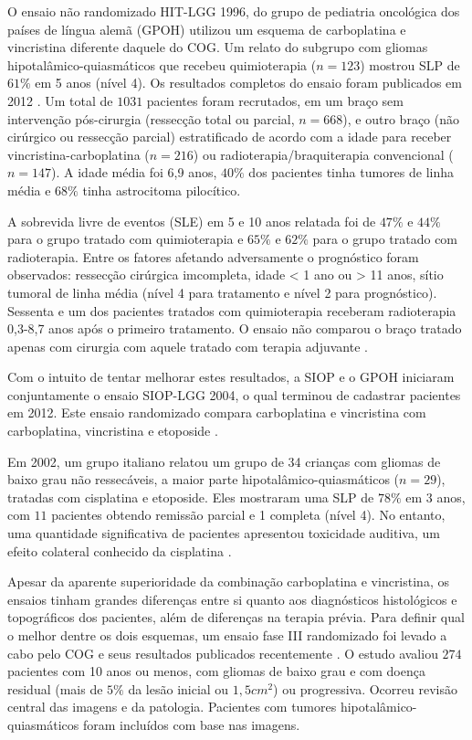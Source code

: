 \documentclass[11pt,a4paper,oldfontcommands]{memoir}
\begin{document}
O ensaio não randomizado HIT-LGG 1996, do grupo de pediatria oncológica dos países de língua alemã (GPOH) utilizou um esquema de carboplatina e vincristina diferente daquele do COG. Um relato do subgrupo com gliomas hipotalâmico-quiasmáticos que recebeu quimioterapia (\(n=123\)) mostrou SLP de \(61\%\) em 5 anos \cite{gnekow} (nível 4). Os resultados completos do ensaio foram publicados em 2012 \cite{gnekow2}. Um total de \(1031\) pacientes foram recrutados, em um braço sem intervenção pós-cirurgia (ressecção total ou parcial, \(n = 668\)), e outro braço (não cirúrgico ou ressecção parcial) estratificado de acordo com a idade para receber vincristina-carboplatina (\(n = 216\)) ou radioterapia/braquiterapia convencional (\(n = 147\)). A idade média foi 6,9 anos, \(40\%\) dos pacientes tinha tumores de linha média e \(68\%\) tinha astrocitoma pilocítico. 

A sobrevida livre de eventos (SLE) em 5 e 10 anos relatada foi de \(47\%\) e \(44\%\) para o grupo tratado com quimioterapia e \(65\%\) e \(62\%\) para o grupo tratado com radioterapia. Entre os fatores afetando adversamente o prognóstico foram observados: ressecção cirúrgica imcompleta, idade < 1 ano ou > 11 anos, sítio tumoral de linha média (nível 4 para tratamento e nível 2 para prognóstico). Sessenta e um dos pacientes tratados com quimioterapia receberam radioterapia 0,3-8,7 anos após o primeiro tratamento. O ensaio não comparou o braço tratado apenas com cirurgia com aquele tratado com terapia adjuvante \cite{gnekow2}. 

Com o intuito de tentar melhorar estes resultados, a SIOP e o GPOH iniciaram conjuntamente o ensaio SIOP-LGG 2004, o qual terminou de cadastrar pacientes em 2012. Este ensaio randomizado compara carboplatina e vincristina com carboplatina, vincristina e etoposide \cite{gnekow3}. 

Em 2002, um grupo italiano relatou um grupo de 34 crianças com gliomas de baixo grau não ressecáveis, a maior parte hipotalâmico-quiasmáticos (\(n=29\)), tratadas com cisplatina e etoposide. Eles mostraram uma SLP de \(78\%\) em 3 anos, com \(11\) pacientes obtendo remissão parcial e 1 completa (nível 4). No entanto, uma quantidade significativa de pacientes apresentou toxicidade auditiva, um efeito colateral conhecido da cisplatina \cite{mass}.

Apesar da aparente superioridade da combinação carboplatina e vincristina, os ensaios tinham grandes diferenças entre si quanto aos diagnósticos histológicos e topográficos dos pacientes, além de diferenças na terapia prévia. Para definir qual o melhor dentre os dois esquemas, um ensaio fase III randomizado foi levado a cabo pelo COG e seus resultados publicados recentemente \cite{Ater20072012}. O estudo avaliou \(274\) pacientes com 10 anos ou menos, com gliomas de baixo grau e com doença residual (mais de \(5\%\) da lesão inicial ou \(1,5 cm^2\)) ou progressiva. Ocorreu revisão central das imagens e da patologia. Pacientes com tumores hipotalâmico-quiasmáticos foram incluídos com base nas imagens. 
\end{document}
